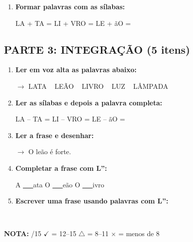 \begin{exercicio}
\begin{enumerate}[resume]
  \item \textbf{Formar palavras com as sílabas:}
  \begin{center}
  LA + TA = \underline{\hspace{2cm}} \quad LI + VRO = \underline{\hspace{2cm}} \quad LE + ãO = \underline{\hspace{2cm}}
  \end{center}
\end{enumerate}

\subsection*{PARTE 3: INTEGRAÇÃO (5 itens)}

\begin{enumerate}[resume]
  \item \textbf{Ler em voz alta as palavras abaixo:}
  \begin{center}
  $\rightarrow$ LATA  ~  LEÃO  ~  LIVRO  ~  LUZ  ~  LÂMPADA
  \end{center}

  \item \textbf{Ler as sílabas e depois a palavra completa:}
  \begin{center}
  LA -- TA = \underline{\hspace{2cm}} \quad LI -- VRO = \underline{\hspace{2cm}} \quad LE -- ãO = \underline{\hspace{2cm}}
  \end{center}

  \item \textbf{Ler a frase e desenhar:}
  \begin{center}
  $\rightarrow$ O leão é forte.
  \end{center}
  \begin{center}
  \end{center}

  \item \textbf{Completar a frase com L'':}
  \begin{center}
  A \underline{~~~}ata \quad O \underline{~~~}eão \quad O \underline{~~~}ivro
  \end{center}

  \item \textbf{Escrever uma frase usando palavras com L'':}
  \begin{center}
  \underline{\hspace{12cm}} \\
  \underline{\hspace{12cm}}
  \end{center}
\end{enumerate}

\noindent\textbf{NOTA:} \underline{\hspace{1cm}}/15 \quad $\checkmark$ = 12--15 \quad $\triangle$ = 8--11 \quad $\times$ = menos de 8
\end{exercicio}

